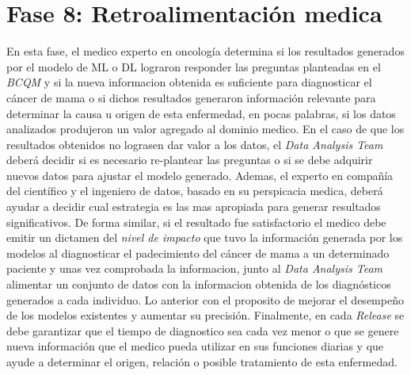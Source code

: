 \section{Fase 8: Retroalimentación medica }
En esta fase, el medico experto en oncología determina si los resultados generados por el modelo de ML o DL lograron responder las preguntas planteadas en el \textit{BCQM} y si la nueva informacion obtenida es suficiente para diagnosticar el cáncer de mama o si dichos resultados generaron información relevante para determinar la causa u origen de esta enfermedad, en pocas palabras, si los datos analizados produjeron un valor agregado al dominio medico. En el caso de que los resultados obtenidos no lograsen dar valor a los datos, el \textit{Data Analysis Team} deberá decidir si es necesario re-plantear las preguntas o si se debe adquirir nuevos datos para ajustar el modelo generado. Ademas, el experto en compañía del científico y el ingeniero de datos, basado en su perspicacia medica, deberá ayudar a decidir cual estrategia es las mas apropiada para generar resultados significativos. De forma similar, si el resultado fue satisfactorio el medico debe emitir un dictamen del \textit{nivel de impacto} que tuvo la información generada por los modelos al diagnosticar el padecimiento del cáncer de mama a un determinado paciente y unas vez comprobada la informacion, junto al \textit{Data Analysis Team} alimentar un conjunto de datos con la informacion obtenida de los diagnósticos generados a cada individuo. Lo anterior con el proposito de mejorar el desempeño de los modelos existentes y aumentar su precisión. Finalmente, en cada \textit{Release} se debe garantizar que el tiempo de diagnostico sea cada vez menor o que se genere nueva información que el medico pueda utilizar en sus funciones diarias y que ayude a determinar el origen, relación o posible tratamiento de esta enfermedad.

